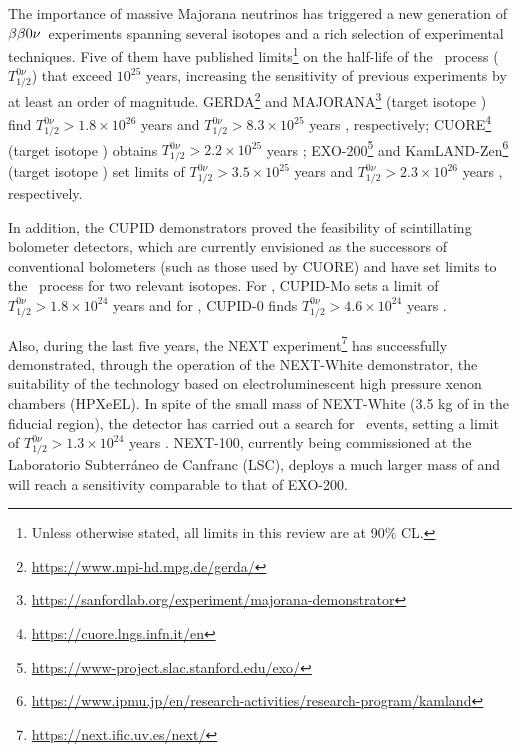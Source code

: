 The importance of massive Majorana neutrinos has triggered a new generation of $\beta\beta0\nu$~experiments spanning several isotopes and a rich selection of experimental techniques. Five of them have published limits\footnote{Unless otherwise stated, all limits in this review are at 90\% CL.} on the half-life of the \bbonu\ process ($T^{0\nu}_{1/2}$) that exceed $10^{25}$ years, increasing the sensitivity of previous  experiments by at least an order of magnitude. GERDA\footnote{\url{https://www.mpi-hd.mpg.de/gerda/}} and MAJORANA\footnote{\url{https://sanfordlab.org/experiment/majorana-demonstrator}} (target isotope ) find \mbox{$T^{0\nu}_{1/2} > 1.8 \times 10^{26}$} years \cite{GERDA:2020xhi} and \mbox{$T^{0\nu}_{1/2} > 8.3 \times 10^{25}$} years \cite{Majorana:2022udl}, respectively; CUORE\footnote{\url{https://cuore.lngs.infn.it/en}} (target isotope ) obtains \mbox{$T^{0\nu}_{1/2} > 2.2 \times 10^{25}$} years \cite{CUORE:2021mvw}; EXO-200\footnote{\url{https://www-project.slac.stanford.edu/exo/}} and KamLAND-Zen\footnote{\url{https://www.ipmu.jp/en/research-activities/research-program/kamland}} (target isotope ) set limits of \mbox{$T^{0\nu}_{1/2} > 3.5 \times 10^{25}$} years \cite{EXO-200:2019rkq} and \mbox{$T^{0\nu}_{1/2} > 2.3 \times 10^{26}$} years \cite{KamLAND-Zen:2022tow}, respectively. 
 
In addition, the CUPID demonstrators proved the feasibility of scintillating bolometer detectors, which are currently envisioned as the successors of conventional bolometers (such as those used by CUORE) and have set limits to the \bbonu\ process for two relevant isotopes. For , CUPID-Mo sets a limit of \mbox{$T^{0\nu}_{1/2} > 1.8 \times 10^{24}$} years \cite{Augier:2022znx} and for , CUPID-0 finds \mbox{$T^{0\nu}_{1/2} > 4.6 \times 10^{24}$} years \cite{CUPID:2022puj}. 

Also, during the last five years, the NEXT experiment\footnote{\url{https://next.ific.uv.es/next/}} has successfully demonstrated, through the operation of the NEXT-White demonstrator, the suitability of the technology based on electroluminescent high pressure xenon chambers (HPXeEL). In spite of the small mass of NEXT-White (3.5 kg of  in the fiducial region), the detector has carried out a search for \bbonu\ events, setting a limit of \mbox{$T^{0\nu}_{1/2} > 1.3 \times 10^{24}$} years  \cite{NEXT:2023daz}. NEXT-100, currently being commissioned at the Laboratorio Subterr\'aneo de Canfranc (LSC), deploys a much larger mass of  and will reach a sensitivity comparable to that of EXO-200.

